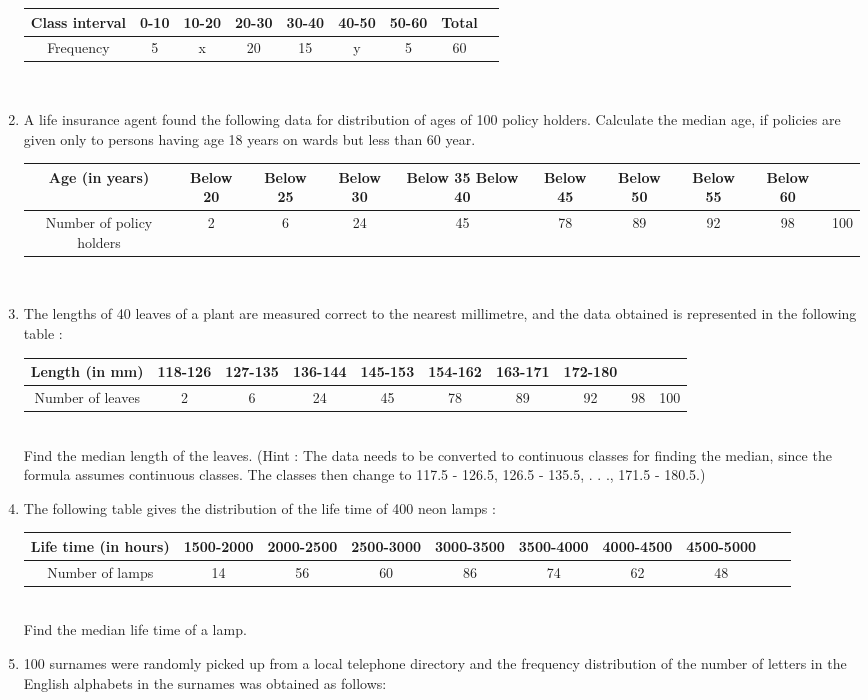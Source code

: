 \begin{enumerate}[label=\arabic*.,ref=\thesubsection.\theenumi]
\begin{tabular}{|c|c|c|c|c|c|c|c|c|}
Class interval&0-10&10-20&20-30&30-40&40-50&50-60& Total\\
\hline
Frequency&5&x&20&15&y&5&60\\
\hline
\end{tabular}\\
\item A life insurance agent found the following data for distribution of ages of 100 policy
holders. Calculate the median age, if policies are given only to persons having age 18
years on wards but less than 60 year.
\begin{tabular}{|c|c|c|c|c|c|c|c|c|c|}
\hline
Age (in years)&Below 20&Below 25&Below 30&Below 35 Below 40& Below 45& Below 50& Below 55& Below 60\\
\hline
Number of policy holders&2&6&24&45&78&89&92&98&100\\
\hline
\end{tabular}\\
\item The lengths of 40 leaves of a plant are measured correct to the nearest millimetre, and
the data obtained is represented in the following table :
\begin{tabular}{|c|c|c|c|c|c|c|c|c|c|}
\hline
Length (in mm)&118-126&127-135&136-144&145-153&154-162&163-171&172-180\\
\hline
Number of leaves&2&6&24&45&78&89&92&98&100\\
\hline
\end{tabular}\\
Find the median length of the leaves.
(Hint : The data needs to be converted to continuous classes for finding the median,
since the formula assumes continuous classes. The classes then change to
117.5 - 126.5, 126.5 - 135.5, . . ., 171.5 - 180.5.)
\item The following table gives the distribution of the life time of 400 neon lamps :
\begin{tabular}{|c|c|c|c|c|c|c|c|c|c|}
\hline
Life time (in hours)&1500-2000&2000-2500&2500-3000&3000-3500&3500-4000&4000-4500&4500-5000\\
\hline
Number of lamps&14&56&60&86&74&62&48\\
\hline
\end{tabular}\\
Find the median life time of a lamp.
\item 100 surnames were randomly picked up from a local telephone directory and the
frequency distribution of the number of letters in the English alphabets in the surnames
was obtained as follows:

\end{enumerate}
